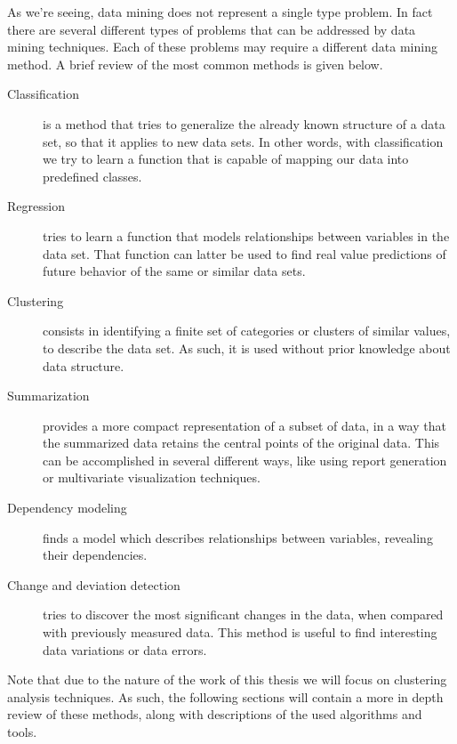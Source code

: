 As we're seeing, data mining does not represent a single type problem. In fact
there are several different types of problems that can be addressed by data
mining techniques. Each of these problems may require a different data mining
method. A brief review of the most common methods is given below.

\begin{description}

  \item[Classification]
  is a method that tries to generalize the already known structure of a
  data set, so that it applies to new data sets. In other words, with
  classification we try to learn a function that is capable of mapping our data
  into predefined classes.

  \item[Regression]
  tries to learn a function that models relationships between variables in the
  data set. That function can latter be used to find real value predictions of
  future behavior of the same or similar data sets.

  \item[Clustering]
  consists in identifying a finite set of categories or clusters of similar
  values, to describe the data set. As such, it is used without prior knowledge
  about data structure.

  \item[Summarization]
  provides a more compact representation of a subset of data, in a way that the
  summarized data retains the central points of the original data. This can be
  accomplished in several different ways, like using report generation or
  multivariate visualization techniques.

  \item[Dependency modeling]
  finds a model which describes relationships between variables, revealing their
  dependencies.

  \item[Change and deviation detection]
  tries to discover the most significant changes in the data, when compared with
  previously measured data. This method is useful to find interesting data
  variations or data errors.

\end{description}

Note that due to the nature of the work of this thesis we will focus on
clustering analysis techniques. As such, the following sections will contain a
more in depth review of these methods, along with descriptions of the used
algorithms and tools.

